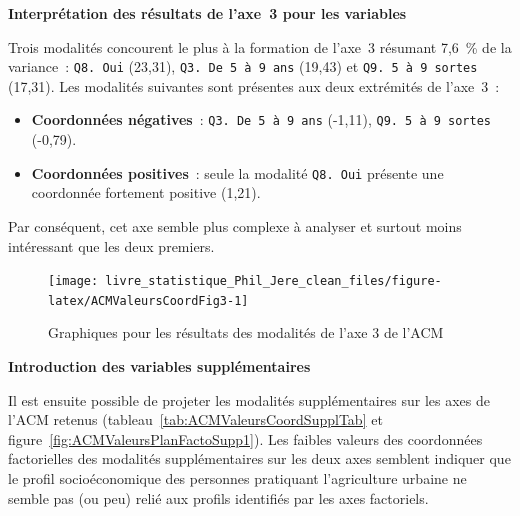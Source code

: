 \documentclass[
  11pt,
  french,
]{book}
\providecommand{\tightlist}{%
  \setlength{\itemsep}{0pt}\setlength{\parskip}{0pt}}
\begin{document}
\textbf{Interprétation des résultats de l'axe~3 pour les variables}

Trois modalités concourent le plus à la formation de l'axe~3 résumant 7,6~\% de la variance~: \texttt{Q8.\ Oui} (23,31), \texttt{Q3.\ De\ 5\ à\ 9\ ans} (19,43) et \texttt{Q9.\ 5\ à\ 9\ sortes} (17,31). Les modalités suivantes sont présentes aux deux extrémités de l'axe~3~:

\begin{itemize}
\tightlist
\item
  \textbf{Coordonnées négatives}~: \texttt{Q3.\ De\ 5\ à\ 9\ ans} (-1,11), \texttt{Q9.\ 5\ à\ 9\ sortes} (-0,79).
\item
  \textbf{Coordonnées positives}~: seule la modalité \texttt{Q8.\ Oui} présente une coordonnée fortement positive (1,21).
\end{itemize}

Par conséquent, cet axe semble plus complexe à analyser et surtout moins intéressant que les deux premiers.

\begin{figure}

{\centering \texttt{[image: livre\_statistique\_Phil\_Jere\_clean\_files/figure-latex/ACMValeursCoordFig3-1]} 

}

\caption{Graphiques pour les résultats des modalités de l'axe 3 de l'ACM}\label{fig:ACMValeursCoordFig3}
\end{figure}

\textbf{Introduction des variables supplémentaires}

Il est ensuite possible de projeter les modalités supplémentaires sur les axes de l'ACM retenus (tableau~\ref{tab:ACMValeursCoordSupplTab} et figure~\ref{fig:ACMValeursPlanFactoSupp1}). Les faibles valeurs des coordonnées factorielles des modalités supplémentaires sur les deux axes semblent indiquer que le profil socioéconomique des personnes pratiquant l'agriculture urbaine ne semble pas (ou peu) relié aux profils identifiés par les axes factoriels.
\end{document}
